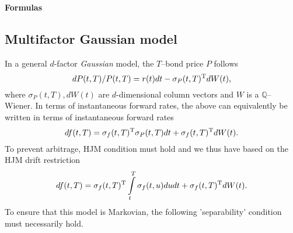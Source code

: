 \documentclass[11pt,a4paper]{article}
\numberwithin{equation}{section}
\begin{document}
\begin{center}
{\LARGE \textbf{Formulas}}
\end{center}

\subsection{Multifactor Gaussian model}
In a general $d$-factor \textit{Gaussian} model, the $T$--bond price $P$ follows
\begin{equation}\label{eq:bond_price_gaussian_2f}
  dP(t,T)/P(t,T) = r(t)dt - {\sigma _P}{(t,T)^{\rm{T}}}dW(t),
\end{equation}
where ${\sigma _P}(t,T), dW(t)$ are $d$-dimensional column vectors and $W$ is a $\mathbb{Q}$--Wiener. In terms of instantaneous forward rates, the above can equivalently be written in terms of instantaneous forward rates
\begin{equation*}
  df(t,T) = {\sigma _f}{(t,T)^{\rm{T}}}{\sigma _P}(t,T)dt + {\sigma _f}{(t,T)^{\rm{T}}}dW(t).
\end{equation*}
To prevent arbitrage, HJM condition must hold and we thus have based on the HJM drift restriction
\begin{equation*}
  df(t,T) = {\sigma _f}{(t,T)^{\rm{T}}}\int\limits_t^T {{\sigma _f}(t,u)du} dt + {\sigma _f}{(t,T)^{\rm{T}}}dW(t).
\end{equation*}
To ensure that this model is Markovian, the following 'separability' condition must necessarily hold.
\end{document}
